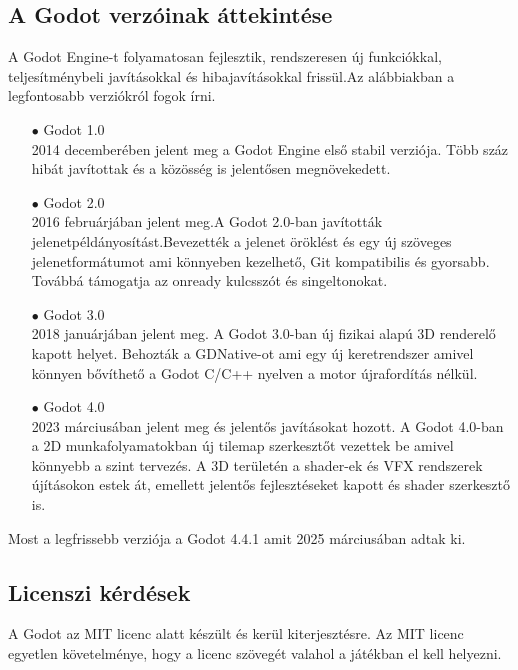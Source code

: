 \documentclass[
]{thesis-ekf}
\theoremstyle{definition}
\theoremstyle{remark}
\begin{document}
\subsection{A Godot verzóinak áttekintése}
A Godot Engine-t folyamatosan fejlesztik, rendszeresen új funkciókkal, teljesítménybeli javításokkal és hibajavításokkal frissül.Az alábbiakban a legfontosabb verziókról fogok írni.
\begin{itemize}
	\item[$\bullet$] Godot 1.0 \\ 2014 decemberében jelent meg a Godot Engine első stabil verziója. Több száz hibát javítottak és a közösség is jelentősen megnövekedett.\cite{Godot1.0}
	\item[$\bullet$] Godot 2.0 \\ 2016 februárjában jelent meg.A Godot 2.0-ban javították jelenetpéldányosítást.Bevezették a jelenet öröklést és egy új szöveges jelenetformátumot ami könnyeben kezelhető, Git kompatibilis és gyorsabb. Továbbá támogatja az onready kulcsszót és singeltonokat.\cite{Godot2.0}
	\item[$\bullet$] Godot 3.0 \\ 2018 januárjában jelent meg. A Godot 3.0-ban új fizikai alapú 3D renderelő kapott helyet. Behozták a GDNative-ot  ami egy új keretrendszer amivel könnyen bővíthető a Godot C/C++ nyelven a motor újrafordítás nélkül.\cite{Godot3.0}
	\item [$\bullet$] Godot 4.0\\  2023 márciusában jelent meg és jelentős javításokat hozott.  A Godot 4.0-ban a 2D munkafolyamatokban új tilemap szerkesztőt vezettek be amivel könnyebb a szint tervezés. A 3D területén a shader-ek és VFX rendszerek újításokon estek át, emellett jelentős fejlesztéseket kapott és shader szerkesztő is.\cite{Godot4.0}
\end{itemize}
Most a legfrissebb verziója a Godot 4.4.1 amit 2025 márciusában adtak ki.
\subsection{Licenszi kérdések}
A Godot az MIT licenc alatt készült és kerül kiterjesztésre. Az MIT licenc egyetlen követelménye, hogy a licenc szövegét valahol a játékban el kell helyezni.\cite{GodotLicenc}
\end{document}
